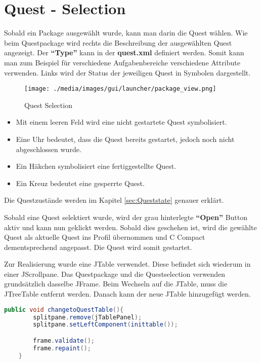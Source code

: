\section{Quest - Selection}

Sobald ein Package ausgewählt wurde, kann man darin die Quest wählen. Wie beim Questpackage wird rechts die Beschreibung der ausgewählten Quest angezeigt. Der \textbf{"`Type"'} kann in der \textbf{quest.xml} definiert werden. Somit kann man zum Beispiel für verschiedene Aufgabenbereiche verschiedene Attribute verwenden. Links wird der Status der jeweiligen Quest in Symbolen dargestellt.

\begin{figure}[h] 
  \centering
     \texttt{[image: ./media/images/gui/launcher/package\_view.png]}
  \caption{Quest Selection}
  \label{fig:Bild1}
\end{figure}

\begin{itemize}
\item Mit einem leeren Feld wird eine nicht gestartete Quest symbolisiert.
\item Eine Uhr bedeutet, dass die Quest bereits gestartet, jedoch noch nicht abgeschlossen wurde.
\item Ein Häkchen symbolisiert eine fertiggestellte Quest.
\item Ein Kreuz bedeutet eine gesperrte Quest. 
\end{itemize}

Die Questzustände werden im Kapitel \ref{sec:Queststate} genauer erklärt.

Sobald eine Quest selektiert wurde, wird der grau hinterlegte \textbf{"`Open"'} Button aktiv und kann nun geklickt werden. Sobald dies geschehen ist, wird die gewählte Quest als aktuelle Quest ins Profil übernommen und C Compact dementsprechend angepasst. Die Quest wird somit gestartet.

Zur Realisierung wurde eine JTable verwendet. Diese befindet sich wiederum in einer JScrollpane. Das Questpackage und die Questselection verwenden grundsätzlich dasselbe JFrame. Beim Wechseln auf die JTable, muss die JTreeTable entfernt werden. Danach kann der neue JTable hinzugefügt werden.
\begin{lstlisting}[language=JAVA]
	public void changetoQuestTable(){
		splitpane.remove(jTablePanel);
		splitpane.setLeftComponent(inittable());

		frame.validate();
		frame.repaint();
	}
\end{lstlisting}

